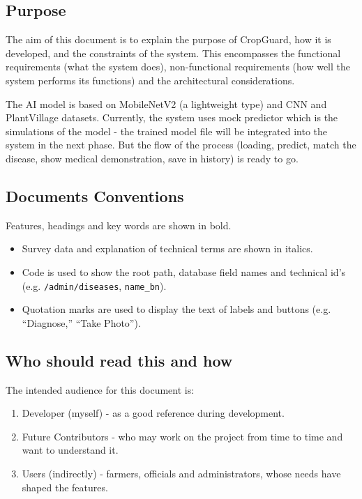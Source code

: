\documentclass[12pt,a4paper]{article}
\begin{document}
\subsection{Purpose}

The aim of this document is to explain the purpose of CropGuard, how it is developed, and the constraints of the system. This encompasses the functional requirements (what the system does), non-functional requirements (how well the system performs its functions) and the architectural considerations.

The AI model is based on MobileNetV2 (a lightweight type) and CNN and PlantVillage datasets. Currently, the system uses mock predictor which is the simulations of the model - the trained model file will be integrated into the system in the next phase. But the flow of the process (loading, predict, match the disease, show medical demonstration, save in history) is ready to go.

\subsection{Documents Conventions}

Features, headings and key words are shown in bold.
\begin{itemize}[leftmargin=2em]
  \item Survey data and explanation of technical terms are shown in italics.
  \item Code is used to show the root path, database field names and technical id's (e.g. \texttt{/admin/diseases}, \texttt{name\_bn}).
  \item Quotation marks are used to display the text of labels and buttons (e.g. ``Diagnose,'' ``Take Photo'').
\end{itemize}

\subsection{Who should read this and how}

The intended audience for this document is:

\begin{enumerate}[leftmargin=2em]
  \item Developer (myself) - as a good reference during development.
  \item Future Contributors - who may work on the project from time to time and want to understand it.
  \item Users (indirectly) - farmers, officials and administrators, whose needs have shaped the features.
\end{enumerate}
\end{document}
